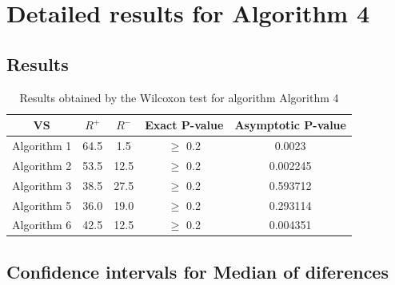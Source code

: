 \documentclass[a4paper,10pt]{article}
\begin{document}
 \clearpage 


\section{Detailed results for Algorithm 4}


\subsection{Results}

\begin{table}[!htp]
\centering\small
\begin{tabular}{
|c|c|c|c|c|}
\hline
 VS & $R^{+}$ & $R^{-}$ & Exact P-value & Asymptotic P-value \\ \hline 
Algorithm 1 & 64.5 & 1.5 & $\geq$ 0.2 & 0.0023\\ \hline 
Algorithm 2 & 53.5 & 12.5 & $\geq$ 0.2 & 0.002245\\ \hline 
Algorithm 3 & 38.5 & 27.5 & $\geq$ 0.2 & 0.593712\\ \hline 
Algorithm 5 & 36.0 & 19.0 & $\geq$ 0.2 & 0.293114\\ \hline 
Algorithm 6 & 42.5 & 12.5 & $\geq$ 0.2 & 0.004351\\ \hline 

\end{tabular}
\caption{Results obtained by the Wilcoxon test for algorithm Algorithm 4}
\end{table}

\subsection{Confidence intervals for Median of diferences}
\end{document}
